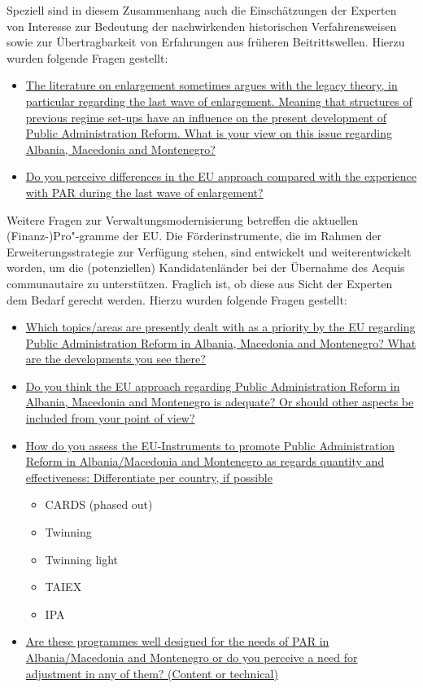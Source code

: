 Speziell sind in diesem Zusammenhang auch die Einschätzungen der Experten von Interesse zur Bedeutung der nachwirkenden historischen Verfahrensweisen sowie zur Übertragbarkeit von Erfahrungen aus früheren Beitrittswellen. Hierzu wurden folgende Fragen gestellt:
\begin{itemize}[label={}]
\item \ul{The literature on enlargement sometimes argues with the legacy theory, in particular regarding the last wave of enlargement. Meaning that structures of previous regime set-ups have an influence on the present development of Public Administration Reform. What is your view on this issue regarding Albania, Macedonia and Montenegro?}
\item \ul{Do you perceive differences in the EU approach compared with the experience with PAR during the last wave of enlargement?}
\end{itemize}
Weitere Fragen zur Verwaltungsmodernisierung betreffen die aktuellen (Finanz-)Pro"-gramme der EU. Die Förderinstrumente, die im Rahmen der Erweiterungsstrategie zur Verfügung stehen, sind entwickelt und weiterentwickelt worden, um die (potenziellen) Kandidatenländer bei der Übernahme des Acquis communautaire zu unterstützen. Fraglich ist, ob diese aus Sicht der Experten dem Bedarf gerecht werden. Hierzu wurden folgende Fragen gestellt:
\begin{itemize}[label={}]
\item \ul{Which topics/areas are presently dealt with as a priority by the EU regarding Public Administration Reform in Albania, Macedonia and Montenegro? What are the developments you see there?}
\item \ul{Do you think the EU approach regarding Public Administration Reform in Albania, Macedonia and Montenegro is adequate? Or should other aspects be included from your point of view?}
\item \ul{How do you assess the EU-Instruments to promote Public Administration Reform in Albania/Macedonia and Montenegro as regards quantity and effectiveness:
Differentiate per country, if possible}
\begin{itemize}
\item CARDS (phased out)
\item Twinning
\item Twinning light
\item TAIEX
\item IPA
\end{itemize}
\item \ul{Are these programmes well designed for the needs of PAR in Albania/Macedonia and Montenegro or do you perceive a need for adjustment in any of them? (Content or technical)}
\end{itemize}
